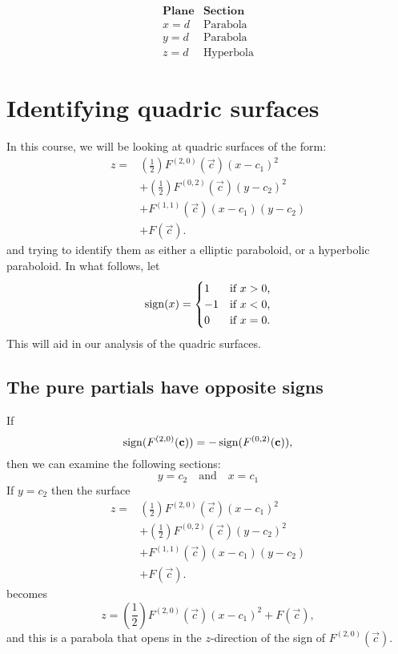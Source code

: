 \documentclass{ximera}
\begin{document}
\[
\begin{array}{cc}
\textbf{Plane}  & \textbf{Section} \\ \hline
x=d & \text{Parabola}\\
y=d & \text{Parabola}\\
z=d & \text{Hyperbola}
\end{array}
\]

\section{Identifying quadric surfaces}

In this course, we will be looking at quadric surfaces of the form: 
\begin{align*}
  z = &\left(\frac{1}{2}\right)F^{(2,0)}(\vec{c})(x-c_1)^2\\
  &+ \left(\frac{1}{2}\right)F^{(0,2)}(\vec{c})(y-c_2)^2 \\
  &+ F^{(1,1)}(\vec{c}) (x-c_1)(y-c_2)\\
  &+ F(\vec{c}).
\end{align*}
and trying to identify them as either a elliptic paraboloid, or a
hyperbolic paraboloid. In what follows, let
\[
\operatorname{sign}(x) =
\begin{cases}
  1  &\text{if $x>0$,}\\
  -1 &\text{if $x<0$,}\\
  0  &\text{if $x=0$.}
\end{cases}
\]
This will aid in our analysis of the quadric surfaces.

\subsection{The pure partials have opposite signs}
If
\[
\operatorname{sign}(F^{(2,0)}(\mathbf{c})) = -\operatorname{sign}(F^{(0,2)}(\mathbf{c})),
\]
then we can examine the following sections:
\[
y= c_2 \quad\text{and}\quad x = c_1
\]
If $y=c_2$ then the surface
\begin{align*}
  z = &\left(\frac{1}{2}\right)F^{(2,0)}(\vec{c})(x-c_1)^2\\
  &+ \left(\frac{1}{2}\right)F^{(0,2)}(\vec{c})(y-c_2)^2 \\
  &+ F^{(1,1)}(\vec{c}) (x-c_1)(y-c_2)\\
  &+ F(\vec{c}).
\end{align*}
becomes
\[
z = \left(\frac{1}{2}\right)F^{(2,0)}(\vec{c})(x-c_1)^2 + F(\vec{c}),
\]
and this is a parabola that opens in the $z$-direction of the sign of
$F^{(2,0)}(\vec{c})$.
\end{document}
